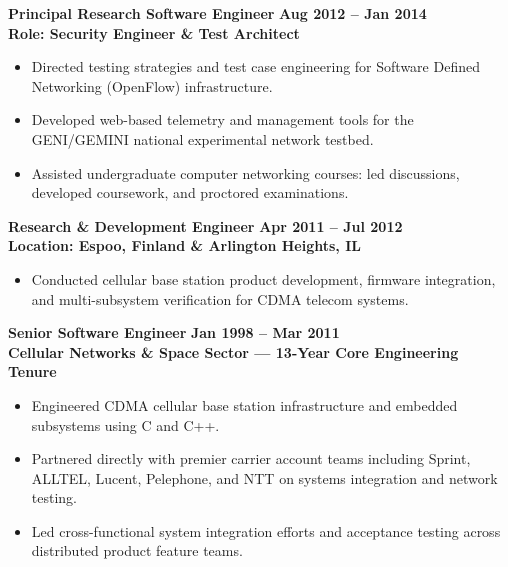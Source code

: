 \documentclass[10pt, a4paper]{article}
\begin{document}
\vspace{4pt}
\noindent\textbf{Principal Research Software Engineer} \hfill {\color{muted}\textbf{Aug 2012 -- Jan 2014}} \\
{\color{accent}\textbf{Role: Security Engineer \& Test Architect}} \enspace\textbar{}
\begin{itemize}
    \item Directed testing strategies and test case engineering for Software Defined Networking (OpenFlow) infrastructure.
    \item Developed web-based telemetry and management tools for the GENI/GEMINI national experimental network testbed.
    \item Assisted undergraduate computer networking courses: led discussions, developed coursework, and proctored examinations.
\end{itemize}

\vspace{4pt}
\noindent\textbf{Research \& Development Engineer} \hfill {\color{muted}\textbf{Apr 2011 -- Jul 2012}} \\
{\color{accent}\textbf{Location: Espoo, Finland \& Arlington Heights, IL}} \enspace\textbar{}
\begin{itemize}
    \item Conducted cellular base station product development, firmware integration, and multi-subsystem verification for CDMA telecom systems.
\end{itemize}

\vspace{4pt}
\noindent\textbf{Senior Software Engineer} \hfill {\color{muted}\textbf{Jan 1998 -- Mar 2011}} \\
{\color{accent}\textbf{Cellular Networks \& Space Sector --- 13-Year Core Engineering Tenure}} \enspace\textbar{}
\begin{itemize}
    \item Engineered CDMA cellular base station infrastructure and embedded subsystems using C and C++.
    \item Partnered directly with premier carrier account teams including Sprint, ALLTEL, Lucent, Pelephone, and NTT on systems integration and network testing.
    \item Led cross-functional system integration efforts and acceptance testing across distributed product feature teams.
\end{itemize}
\end{document}
